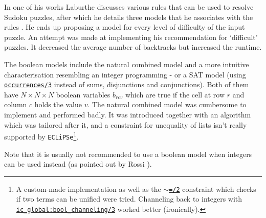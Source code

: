 In one of his works Laburthe discusses various rules that can be used to resolve Sudoku puzzles, after which he details three models that he associates with the rules \cite{article:laburthe}. He ends up proposing a model for every level of difficulty of the input puzzle. An attempt was made at implementing his recommendation for `difficult' puzzles. It decreased the average number of backtracks but increased the runtime. \\\par

The boolean models include the natural combined model \cite{article:natural} and a more intuitive characterisation resembling an integer programming - or a SAT model \cite{article:sat} (using \href{http://eclipseclp.org/doc/bips/lib/ic_global/occurrences-3.html}{\texttt{occurrences/3}} instead of sums, disjunctions and conjunctions). Both of them have $N\times N\times N$ boolean variables $b_{rcv}$ which are true if the cell at row $r$ and column $c$ holds the value $v$. The natural combined model was cumbersome to implement and performed badly. It was introduced together with an algorithm which was tailored after it, and a constraint for unequality of lists isn't really supported by \texttt{ECLiPSe}\footnote{A custom-made implementation as well as the \href{https://eclipseclp.org/doc/bips/kernel/termcomp/TE-2.html}{\texttt{$\sim$=/2}} constraint which checks if two terms can be unified were tried. Channeling back to integers with \href{http://eclipseclp.org/doc/bips/lib/ic_global/bool_channeling-3.html}{\texttt{ic\_global:bool\_channeling/3}} worked better (ironically).}.\par
Note that it is usually not recommended to use a boolean model when integers can be used instead (as pointed out by Rossi \cite{book:rossi}).\\\par

